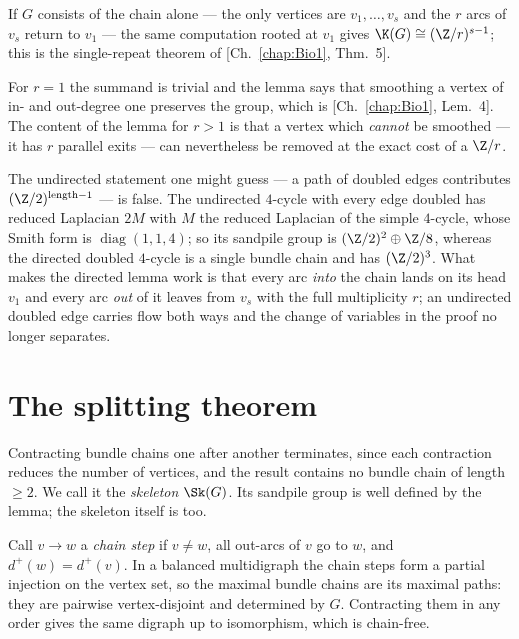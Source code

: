 If $G$ consists of the chain alone --- the only vertices are $v_1,\dots,v_s$ and the $r$
arcs of $v_s$ return to $v_1$ --- the same computation rooted at $v_1$ gives
$\K(G)\cong(\Z/r)^{s-1}$; this is the single-repeat theorem of [Ch.~\ref{chap:Bio1}, Thm.~5].

\begin{remark}\label{Bio3:rem:r1}
For $r=1$ the summand is trivial and the lemma says that smoothing a vertex of in- and
out-degree one preserves the group, which is [Ch.~\ref{chap:Bio1}, Lem.~4]. The content of the
lemma for $r>1$ is that a vertex which \emph{cannot} be smoothed --- it has $r$ parallel
exits --- can nevertheless be removed at the exact cost of a $\Z/r$.
\end{remark}

\begin{remark}\label{Bio3:rem:undirected}
The undirected statement one might guess --- a path of doubled edges contributes
$(\Z/2)^{\text{length}-1}$ --- is false. The undirected $4$-cycle with every edge doubled
has reduced Laplacian $2M$ with $M$ the reduced Laplacian of the simple $4$-cycle, whose
Smith form is $\operatorname{diag}(1,1,4)$; so its sandpile group is
$(\Z/2)^{2}\oplus\Z/8$, whereas the directed doubled $4$-cycle is a single bundle chain and
has $(\Z/2)^{3}$. What makes the directed lemma work is that every arc \emph{into} the
chain lands on its head $v_1$ and every arc \emph{out} of it leaves from $v_s$ with the
full multiplicity $r$; an undirected doubled edge carries flow both ways and the change
of variables in the proof no longer separates.
\end{remark}

\section{The splitting theorem}\label{Bio3:sec:split}

Contracting bundle chains one after another terminates, since each contraction reduces
the number of vertices, and the result contains no bundle chain of length $\ge2$. We call
it the \emph{skeleton} $\Sk(G)$. Its sandpile group is well defined by the lemma; the
skeleton itself is too.

\begin{lemma}\label{Bio3:lem:canon}
Call $v\to w$ a \emph{chain step} if $v\ne w$, all out-arcs of $v$ go to $w$, and
$d^+(w)=d^+(v)$. In a balanced multidigraph the chain steps form a partial injection on
the vertex set, so the maximal bundle chains are its maximal paths: they are pairwise
vertex-disjoint and determined by $G$. Contracting them in any order gives the same
digraph up to isomorphism, which is chain-free.
\end{lemma}

